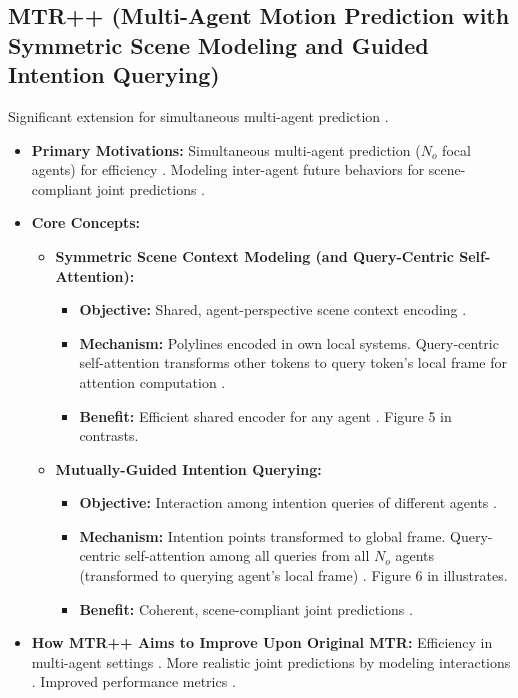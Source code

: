 \subsection{MTR++ (Multi-Agent Motion Prediction with Symmetric Scene Modeling and Guided Intention Querying)}
Significant extension for simultaneous multi-agent prediction \cite{Shi2023MTRplusplus}.
\begin{itemize}
    \item \textbf{Primary Motivations:} Simultaneous multi-agent prediction ($N_o$ focal agents) for efficiency \cite{Shi2023MTRplusplus}. Modeling inter-agent future behaviors for scene-compliant joint predictions \cite{Shi2023MTRplusplus}.
    \item \textbf{Core Concepts:}
    \begin{itemize}
        \item \textbf{Symmetric Scene Context Modeling (and Query-Centric Self-Attention):}
        \begin{itemize}
            \item \textbf{Objective:} Shared, agent-perspective scene context encoding \cite{Shi2023MTRplusplus}.
            \item \textbf{Mechanism:} Polylines encoded in own local systems. Query-centric self-attention transforms other tokens to query token's local frame for attention computation \cite{Shi2023MTRplusplus}.
            \item \textbf{Benefit:} Efficient shared encoder for any agent \cite{Shi2023MTRplusplus}. Figure 5 in \cite{Shi2023MTRplusplus} contrasts.
        \end{itemize}
        \item \textbf{Mutually-Guided Intention Querying:}
        \begin{itemize}
            \item \textbf{Objective:} Interaction among intention queries of different agents \cite{Shi2023MTRplusplus}.
            \item \textbf{Mechanism:} Intention points transformed to global frame. Query-centric self-attention among all queries from all $N_o$ agents (transformed to querying agent's local frame) \cite{Shi2023MTRplusplus}. Figure 6 in \cite{Shi2023MTRplusplus} illustrates.
            \item \textbf{Benefit:} Coherent, scene-compliant joint predictions \cite{Shi2023MTRplusplus}.
        \end{itemize}
    \end{itemize}
    \item \textbf{How MTR++ Aims to Improve Upon Original MTR:} Efficiency in multi-agent settings \cite{Shi2023MTRplusplus}. More realistic joint predictions by modeling interactions \cite{Shi2023MTRplusplus}. Improved performance metrics \cite{Shi2023MTRplusplus}.
\end{itemize}

